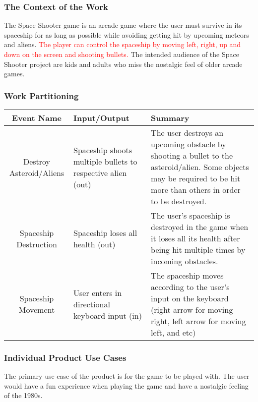 \documentclass[12pt, titlepage]{article}
\begin{document}
\subsubsection{The Context of the Work}
The Space Shooter game is an arcade game where the user must survive in its spaceship for as long as possible while avoiding getting hit by upcoming meteors and aliens. \textcolor{red}{The player can control the spaceship by moving left, right, up and down on the screen and shooting bullets.} The intended audience of the Space Shooter project are kids and adults who miss the nostalgic feel of older arcade games. 

\subsubsection{Work Partitioning}
\begin{table}[H]
\begin{tabular}{|c|p{5cm}|p{5cm}|}
\hline
Event Name & Input/Output & Summary \\ 
\hline
Destroy Asteroid/Aliens & Spaceship shoots multiple bullets to respective alien (out) & The user destroys an upcoming obstacle by shooting a bullet to the asteroid/alien. Some objects may be required to be hit more than others in order to be destroyed. \\ 
\hline
Spaceship Destruction & Spaceship loses all health (out) & The user's spaceship is destroyed in the game when it loses all its health after being hit multiple times by incoming obstacles. \\ 
\hline
Spaceship Movement & User enters in directional keyboard input (in) & The spaceship moves according to the user's input on the keyboard (right arrow for moving right, left arrow for moving left, and etc) \\ 
\hline
\end{tabular}
\end{table}

\subsubsection{Individual Product Use Cases}
The primary use case of the product is for the game to be played with. The user would have a fun experience when playing the game and have a nostalgic feeling of the 1980s. 
\end{document}
